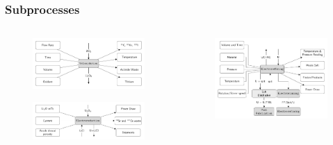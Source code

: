 \begin{frame}
\frametitle{Subprocesses}
\begin{columns}
	\begin{column}{.5\textwidth}
		\begin{figure} 
			\centering
			\includegraphics[width=0.9\linewidth]{volox}
			\label{fig:volox}
		\end{figure}
		\begin{figure} 
			\centering
			\includegraphics[width=0.9\linewidth]{reduction}
			\label{fig:refining}
		\end{figure}
	\end{column}
	\begin{column}{.5\textwidth}
		\begin{figure}
			\centering
			\includegraphics[width=0.9\linewidth]{refining}

\end{figure}
\end{column}
\end{columns}
\end{frame}
